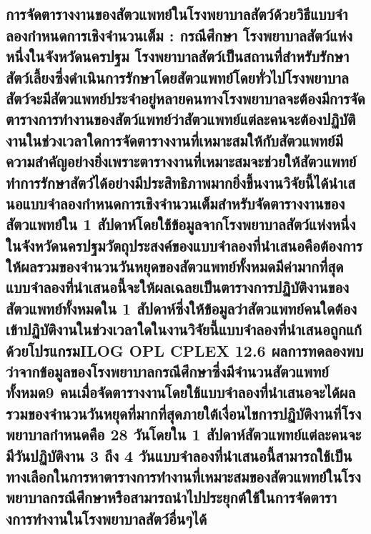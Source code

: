 \hspace{0cm}\subsection{การจัดตารางงานของสัตวแพทย์ในโรงพยาบาลสัตว์ด้วยวิธีแบบจําลองกําหนดการเชิงจํานวนเต็ม : กรณีศึกษา โรงพยาบาลสัตว์แห่งหนึ่งในจังหวัดนครปฐม โรงพยาบาลสัตว์เป็นสถานที่สําหรับรักษาสัตว์เลี้ยงซึ่งดําเนินการรักษาโดยสัตวแพทย์โดยทั่วไปโรงพยาบาลสัตว์จะมีสัตวแพทย์ประจําอยู่หลายคนทางโรงพยาบาลจะต้องมีการจัดตารางการทํางานของสัตว์แพทย์ว่าสัตวแพทย์แต่ละคนจะต้องปฏิบัติงานในช่วงเวลาใดการจัดตารางงานที่เหมาะสมให้กับสัตวแพทย์มีความสําคัญอย่างยิ่งเพราะตารางงานที่เหมาะสมจะช่วยให้สัตวแพทย์ทําการรักษาสัตว์ได้อย่างมีประสิทธิภาพมากยิ่งขึ้นงานวิจัยนี้ได้นําเสนอแบบจําลองกําหนดการเชิงจํานวนเต็มสําหรับจัดตารางงานของสัตวแพทย์ใน 1 สัปดาห์โดยใช้ข้อมูลจากโรงพยาบาลสัตว์แห่งหนึ่งในจังหวัดนครปฐมวัตถุประสงค์ของแบบจําลองที่นําเสนอคือต้องการให้ผลรวมของจํานวนวันหยุดของสัตวแพทย์ทั้งหมดมีค่ามากที่สุดแบบจําลองที่นําเสนอนี้จะให้ผลเฉลยเป็นตารางการปฏิบัติงานของสัตวแพทย์ทั้งหมดใน 1 สัปดาห์ซึ่งให้ข้อมูลว่าสัตวแพทย์คนใดต้องเข้าปฏิบัติงานในช่วงเวลาใดในงานวิจัยนี้แบบจําลองที่นําเสนอถูกแก้ด้วยโปรแกรมILOG OPL CPLEX 12.6 ผลการทดลองพบว่าจากข้อมูลของโรงพยาบาลกรณีศึกษาซึ่งมีจํานวนสัตวแพทย์ทั้งหมด9 คนเมื่อจัดตารางงานโดยใช้แบบจําลองที่นําเสนอจะได้ผลรวมของจํานวนวันหยุดที่มากที่สุดภายใต้เงื่อนไขการปฏิบัติงานที่โรงพยาบาลกําหนดคือ 28 วันโดยใน 1 สัปดาห์สัตวแพทย์แต่ละคนจะมีวันปฏิบัติงาน 3 ถึง 4 วันแบบจําลองที่นําเสนอนี้สามารถใช้เป็นทางเลือกในการหาตารางการทํางานที่เหมาะสมของสัตวแพทย์ในโรงพยาบาลกรณีศึกษาหรือสามารถนําไปประยุกต์ใช้ในการจัดตารางการทํางานในโรงพยาบาลสัตว์อื่นๆได้ \cite{vijai4}}



